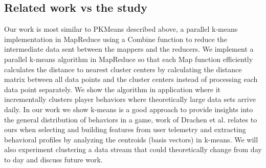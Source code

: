 \subsection{Related work vs the study}
Our work is most similar to PKMeans \citep{Zhao:2009} described above, a parallel k-means implementation in MapReduce using a Combine function to reduce the intermediate data sent between the mappers and the reducers. We implement a parallel k-means algorithm in MapReduce so that each Map function efficiently calculates the distance to nearest cluster centers by calculating the distance matrix between all data points and the cluster centers instead of processing each data point separately. We show the algorithm in application where it incrementally clusters player behaviors where theoretically large data sets arrive daily. In our work we show k-means is a good approach to provide insights into the general distribution of behaviors in a game, work of Drachen et al. \citep{Drachen:2012, Drachen:2013} relates to ours when selecting and building features from user telemetry and extracting behavioral profiles by analyzing the centroids (basis vectors) in k-means. We will also experiment clustering a data stream that could theoretically change from day to day and discuss future work.